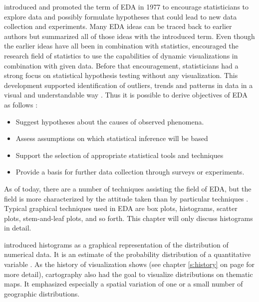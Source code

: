\citeauthor{Tukey1977} introduced and promoted the term of \ac{EDA} in 1977 to encourage statisticians to explore data and possibly formulate hypotheses that could lead to new data collection and experiments. Many \ac{EDA} ideas can be traced back to earlier authors but \citeauthor{Tukey1977} summarized all of those ideas with the introduced term. Even though the earlier ideas have all been in combination with statistics, \citeauthor{Tukey1977} encouraged the research field of statistics to use the capabilities of dynamic visualizations in combination with given data. Before that encouragement, statisticians had a strong focus on statistical hypothesis testing without any visualization. This development supported identification of outliers, trends and patterns in data in a visual and understandable way . Thus it is possible to derive objectives of \ac{EDA} as follows :

\begin{itemize}

\item Suggest hypotheses about the causes of observed phenomena.
\item Assess assumptions on which statistical inference will be based
\item Support the selection of appropriate statistical tools and techniques
\item Provide a basis for further data collection through surveys or experiments.

\end{itemize}

As of today, there are a number of techniques assisting the field of \ac{EDA}, but the field is more characterized by the attitude taken than by particular techniques . Typical graphical techniques used in \ac{EDA} are box plots, histograms, scatter plots, stem-and-leaf plots, and so forth. This chapter will only discuss histograms in detail.

\citeauthor{Pearson1895} introduced histograms as a graphical representation of the distribution of numerical data. It is an estimate of the probability distribution of a quantitative variable . As the history of visualization shows (see chapter \ref{s:history} on page \pageref{s:history} for more detail), cartography also had the goal to visualize distributions on thematic maps. It emphasized especially a spatial variation of one or a small number of geographic distributions.

